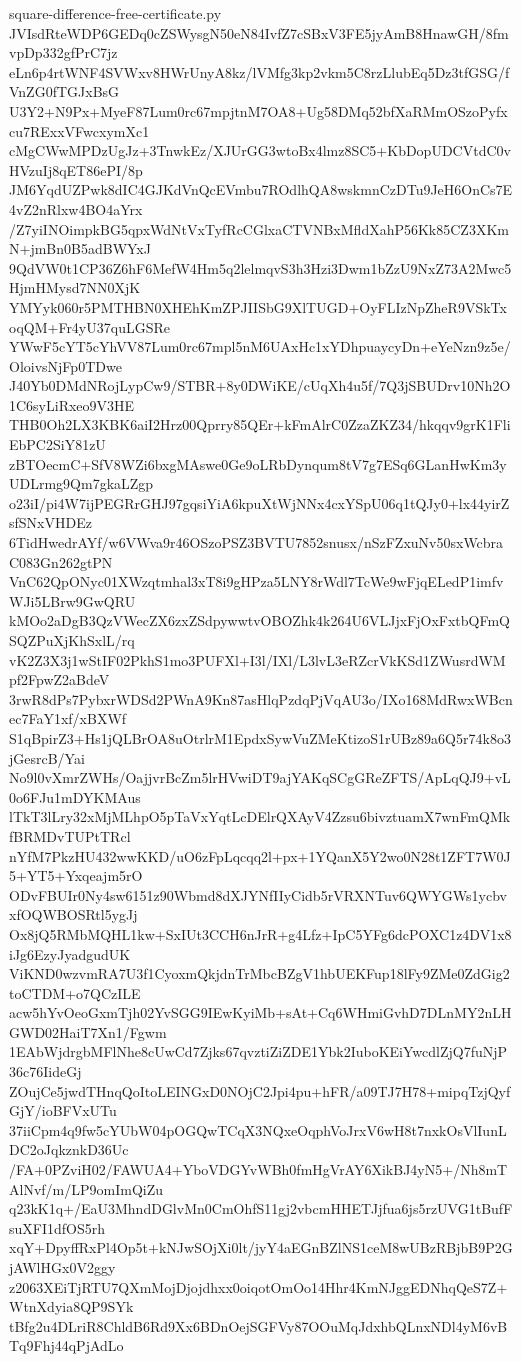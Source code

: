 \documentclass[11pt]{article}
\theoremstyle{definition}
\theoremstyle{remark}
\begin{document}
\begin{filecontents*}[overwrite]{square-difference-free-certificate.py}
JVIsdRteWDP6GEDq0cZSWysgN50eN84IvfZ7cSBxV3FE5jyAmB8HnawGH/8fmvpDp332gfPrC7jz
eLn6p4rtWNF4SVWxv8HWrUnyA8kz/lVMfg3kp2vkm5C8rzLlubEq5Dz3tfGSG/fVnZG0fTGJxBsG
U3Y2+N9Px+MyeF87Lum0rc67mpjtnM7OA8+Ug58DMq52bfXaRMmOSzoPyfxcu7RExxVFwcxymXc1
cMgCWwMPDzUgJz+3TnwkEz/XJUrGG3wtoBx4lmz8SC5+KbDopUDCVtdC0vHVzuIj8qET86ePI/8p
JM6YqdUZPwk8dIC4GJKdVnQcEVmbu7ROdlhQA8wskmnCzDTu9JeH6OnCs7E4vZ2nRlxw4BO4aYrx
/Z7yiINOimpkBG5qpxWdNtVxTyfRcCGlxaCTVNBxMfldXahP56Kk85CZ3XKmN+jmBn0B5adBWYxJ
9QdVW0t1CP36Z6hF6MefW4Hm5q2lelmqvS3h3Hzi3Dwm1bZzU9NxZ73A2Mwc5HjmHMysd7NN0XjK
YMYyk060r5PMTHBN0XHEhKmZPJIISbG9XlTUGD+OyFLIzNpZheR9VSkTxoqQM+Fr4yU37quLGSRe
YWwF5cYT5cYhVV87Lum0rc67mpl5nM6UAxHc1xYDhpuaycyDn+eYeNzn9z5e/OloivsNjFp0TDwe
J40Yb0DMdNRojLypCw9/STBR+8y0DWiKE/cUqXh4u5f/7Q3jSBUDrv10Nh2O1C6syLiRxeo9V3HE
THB0Oh2LX3KBK6aiI2Hrz00Qprry85QEr+kFmAlrC0ZzaZKZ34/hkqqv9grK1FliEbPC2SiY81zU
zBTOecmC+SfV8WZi6bxgMAswe0Ge9oLRbDynqum8tV7g7ESq6GLanHwKm3yUDLrmg9Qm7gkaLZgp
o23iI/pi4W7ijPEGRrGHJ97gqsiYiA6kpuXtWjNNx4cxYSpU06q1tQJy0+lx44yirZsfSNxVHDEz
6TidHwedrAYf/w6VWva9r46OSzoPSZ3BVTU7852snusx/nSzFZxuNv50sxWcbraC083Gn262gtPN
VnC62QpONyc01XWzqtmhal3xT8i9gHPza5LNY8rWdl7TcWe9wFjqELedP1imfvWJi5LBrw9GwQRU
kMOo2aDgB3QzVWecZX6zxZSdpywwtvOBOZhk4k264U6VLJjxFjOxFxtbQFmQSQZPuXjKhSxlL/rq
vK2Z3X3j1wStIF02PkhS1mo3PUFXl+I3l/IXl/L3lvL3eRZcrVkKSd1ZWusrdWMpf2FpwZ2aBdeV
3rwR8dPs7PybxrWDSd2PWnA9Kn87asHlqPzdqPjVqAU3o/IXo168MdRwxWBcnec7FaY1xf/xBXWf
S1qBpirZ3+Hs1jQLBrOA8uOtrlrM1EpdxSywVuZMeKtizoS1rUBz89a6Q5r74k8o3jGesrcB/Yai
No9l0vXmrZWHs/OajjvrBcZm5lrHVwiDT9ajYAKqSCgGReZFTS/ApLqQJ9+vL0o6FJu1mDYKMAus
lTkT3lLry32xMjMLhpO5pTaVxYqtLcDElrQXAyV4Zzsu6bivztuamX7wnFmQMkfBRMDvTUPtTRcl
nYfM7PkzHU432wwKKD/uO6zFpLqcqq2l+px+1YQanX5Y2wo0N28t1ZFT7W0J5+YT5+Yxqeajm5rO
ODvFBUIr0Ny4sw6151z90Wbmd8dXJYNfIIyCidb5rVRXNTuv6QWYGWs1ycbvxfOQWBOSRtl5ygJj
Ox8jQ5RMbMQHL1kw+SxIUt3CCH6nJrR+g4Lfz+IpC5YFg6dcPOXC1z4DV1x8iJg6EzyJyadgudUK
ViKND0wzvmRA7U3f1CyoxmQkjdnTrMbcBZgV1hbUEKFup18lFy9ZMe0ZdGig2toCTDM+o7QCzILE
acw5hYvOeoGxmTjh02YvSGG9IEwKyiMb+sAt+Cq6WHmiGvhD7DLnMY2nLHGWD02HaiT7Xn1/Fgwm
1EAbWjdrgbMFlNhe8cUwCd7Zjks67qvztiZiZDE1Ybk2IuboKEiYwcdlZjQ7fuNjP36c76IideGj
ZOujCe5jwdTHnqQoItoLEINGxD0NOjC2Jpi4pu+hFR/a09TJ7H78+mipqTzjQyfGjY/ioBFVxUTu
37iiCpm4q9fw5cYUbW04pOGQwTCqX3NQxeOqphVoJrxV6wH8t7nxkOsVlIunLDC2oJqkznkD36Uc
/FA+0PZviH02/FAWUA4+YboVDGYvWBh0fmHgVrAY6XikBJ4yN5+/Nh8mTAlNvf/m/LP9omImQiZu
q23kK1q+/EaU3MhndDGlvMn0CmOhfS11gj2vbcmHHETJjfua6js5rzUVG1tBufFsuXFI1dfOS5rh
xqY+DpyffRxPl4Op5t+kNJwSOjXi0lt/jyY4aEGnBZlNS1ceM8wUBzRBjbB9P2GjAWlHGx0V2ggy
z2063XEiTjRTU7QXmMojDjojdhxx0oiqotOmOo14Hhr4KmNJggEDNhqQeS7Z+WtnXdyia8QP9SYk
tBfg2u4DLriR8ChldB6Rd9Xx6BDnOejSGFVy87OOuMqJdxhbQLnxNDl4yM6vBTq9Fhj44qPjAdLo

\end{filecontents*}
\end{document}
